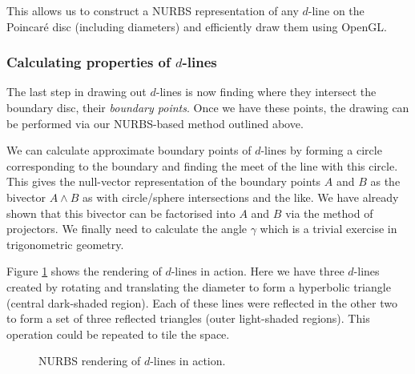 This allows us to construct a NURBS representation of any $d$-line
on the Poincar\'e disc (including diameters) and efficiently draw them
using OpenGL. 

\subsubsection{Calculating properties of $d$-lines}

The last step in drawing out $d$-lines is now finding where they intersect
the boundary disc, their \emph{boundary points}. 
Once we have these points, the drawing can be performed
via our NURBS-based method outlined above.

We can calculate approximate boundary points of $d$-lines
by forming a circle 
corresponding to the boundary and finding the 
meet of the line with this circle. This gives the null-vector
representation of the boundary points $A$ and $B$ as the
bivector $A \wedge B$ as with circle/sphere intersections and the like.
We have already shown that this bivector can be factorised into $A$ and 
$B$ via the method of projectors.
We finally need to calculate the angle $\gamma$ which is a trivial
exercise in trigonometric geometry. 

Figure
\ref{fig:hyp1} shows the rendering of $d$-lines in action.
Here we have three $d$-lines created by rotating and translating the
diameter to form a hyperbolic triangle (central dark-shaded
region). Each of these lines were reflected in the other two to form 
a set of three reflected triangles (outer light-shaded regions). This
operation could be repeated to tile the space.

\begin{figure} \centering
{}
\caption{NURBS rendering of $d$-lines in action.}
\label{fig:hyp1}
\end{figure}

